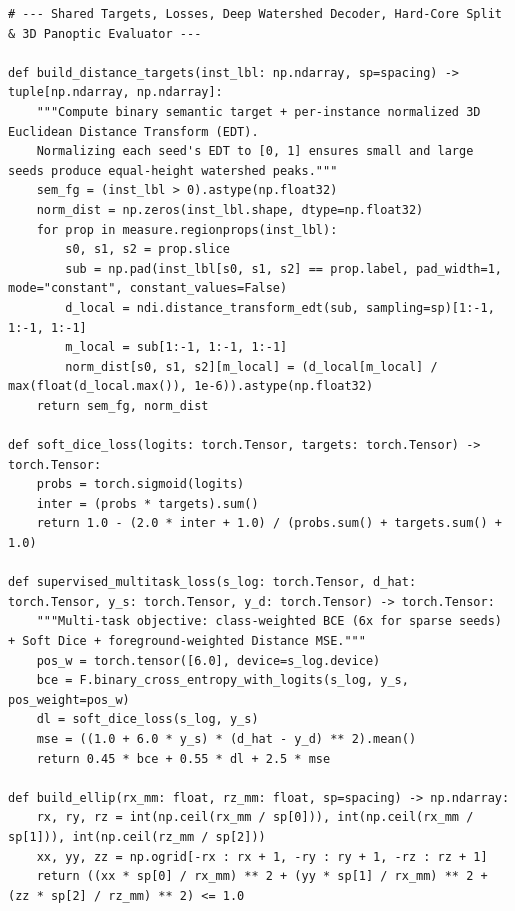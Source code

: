 \documentclass[10pt,a4paper]{article}
\begin{document}
\begin{codebox}[{In [4] $\cdot$ Python --- Step 4 -- Controlled 5-model ablation study (SSL warm-start, Organ-GPS, p=1 vs p=3, calibration)}]
\begin{lstlisting}[style=pybmed]
# --- Shared Targets, Losses, Deep Watershed Decoder, Hard-Core Split & 3D Panoptic Evaluator ---

def build_distance_targets(inst_lbl: np.ndarray, sp=spacing) -> tuple[np.ndarray, np.ndarray]:
    """Compute binary semantic target + per-instance normalized 3D Euclidean Distance Transform (EDT).
    Normalizing each seed's EDT to [0, 1] ensures small and large seeds produce equal-height watershed peaks."""
    sem_fg = (inst_lbl > 0).astype(np.float32)
    norm_dist = np.zeros(inst_lbl.shape, dtype=np.float32)
    for prop in measure.regionprops(inst_lbl):
        s0, s1, s2 = prop.slice
        sub = np.pad(inst_lbl[s0, s1, s2] == prop.label, pad_width=1, mode="constant", constant_values=False)
        d_local = ndi.distance_transform_edt(sub, sampling=sp)[1:-1, 1:-1, 1:-1]
        m_local = sub[1:-1, 1:-1, 1:-1]
        norm_dist[s0, s1, s2][m_local] = (d_local[m_local] / max(float(d_local.max()), 1e-6)).astype(np.float32)
    return sem_fg, norm_dist

def soft_dice_loss(logits: torch.Tensor, targets: torch.Tensor) -> torch.Tensor:
    probs = torch.sigmoid(logits)
    inter = (probs * targets).sum()
    return 1.0 - (2.0 * inter + 1.0) / (probs.sum() + targets.sum() + 1.0)

def supervised_multitask_loss(s_log: torch.Tensor, d_hat: torch.Tensor, y_s: torch.Tensor, y_d: torch.Tensor) -> torch.Tensor:
    """Multi-task objective: class-weighted BCE (6x for sparse seeds) + Soft Dice + foreground-weighted Distance MSE."""
    pos_w = torch.tensor([6.0], device=s_log.device)
    bce = F.binary_cross_entropy_with_logits(s_log, y_s, pos_weight=pos_w)
    dl = soft_dice_loss(s_log, y_s)
    mse = ((1.0 + 6.0 * y_s) * (d_hat - y_d) ** 2).mean()
    return 0.45 * bce + 0.55 * dl + 2.5 * mse

def build_ellip(rx_mm: float, rz_mm: float, sp=spacing) -> np.ndarray:
    rx, ry, rz = int(np.ceil(rx_mm / sp[0])), int(np.ceil(rx_mm / sp[1])), int(np.ceil(rz_mm / sp[2]))
    xx, yy, zz = np.ogrid[-rx : rx + 1, -ry : ry + 1, -rz : rz + 1]
    return ((xx * sp[0] / rx_mm) ** 2 + (yy * sp[1] / rx_mm) ** 2 + (zz * sp[2] / rz_mm) ** 2) <= 1.0


\end{lstlisting}
\end{codebox}
\end{document}

